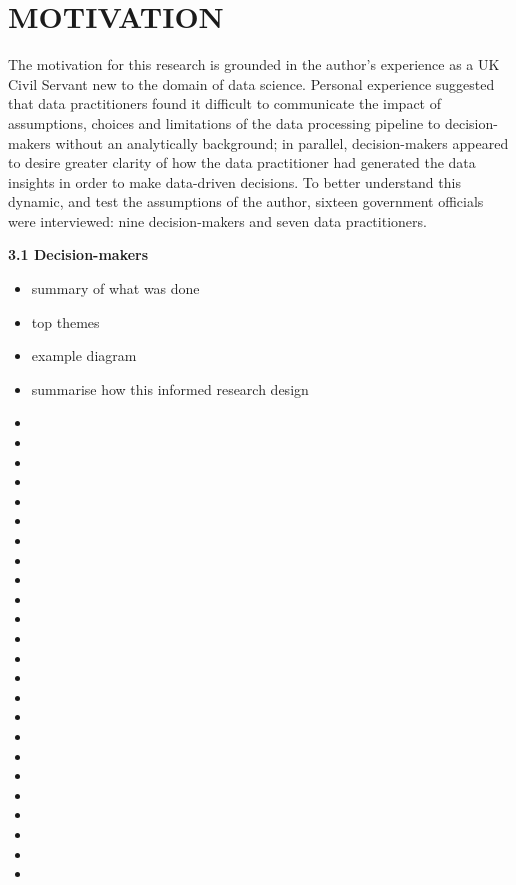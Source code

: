 \documentclass{article}
\providecommand{\tightlist}{%
  \setlength{\itemsep}{0pt}\setlength{\parskip}{0pt}}
\begin{document}
\hypertarget{motivation}{%
\section{MOTIVATION}\label{motivation}}

\label{sec:headings}

The motivation for this research is grounded in the author's experience
as a UK Civil Servant new to the domain of data science. Personal
experience suggested that data practitioners found it difficult to
communicate the impact of assumptions, choices and limitations of the
data processing pipeline to decision-makers without an analytically
background; in parallel, decision-makers appeared to desire greater
clarity of how the data practitioner had generated the data insights in
order to make data-driven decisions. To better understand this dynamic,
and test the assumptions of the author, sixteen government officials
were interviewed: nine decision-makers and seven data practitioners.

\textbf{3.1 Decision-makers}

\begin{itemize}
\tightlist
\item
  summary of what was done
\item
  top themes
\item
  example diagram
\item
  summarise how this informed research design
\item
\item
\item
\item
\item
\item
\item
\item
\item
\item
\item
\item
\item
\item
\item
\item
\item
\item
\item
\item
\item
\item
\item
\item
\end{itemize}
\end{document}
